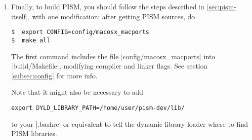 \documentclass[11pt,final]{amsart}
\begin{document}
\begin{enumerate}
{\begin{verbatim}
       if [ "${LIBNAME}" = "libpetscksp" ]; then OTHERLIBS="${PETSC_DM_LIB_BASIC}"  ; fi;\
       if [ "${LIBNAME}" = "libpetscsnes" ]; then OTHERLIBS="${PETSC_KSP_LIB_BASIC}"  ; fi;\
       if [ "${LIBNAME}" = "libpetscts" ]; then OTHERLIBS="${PETSC_SNES_LIB_BASIC}"  ; fi;\
       if [ "${LIBNAME}" = "libpetscfortran" ]; then OTHERLIBS="${PETSC_TS_LIB_BASIC}"  ; fi;\
       if [ "${LIBNAME}" = "libpetsccontrib" ]; then OTHERLIBS="${PETSC_TS_LIB_BASIC}"  ; fi;\
       if [ "${LIBNAME}" = "libslepc" ]; then OTHERLIBS="${PETSC_KSP_LIB_BASIC}"  ; fi;\
       if [ "${MACOSX_DEPLOYMENT_TARGET}" = "" ]; then MACOSX_DEPLOYMENT_TARGET=10.5; export MACOSX_DEPLOYMENT_TARGET; fi;\
       ${CC}  -dynamiclib -single_module -multiply_defined suppress -undefined dynamic_lookup\
              -o ${INSTALL_LIB_DIR}/$$LIBNAME.dylib *.o -L${PETSC_LIB_DIR}  ${OTHERSHAREDLIBS} ${SL_LINKER_LIBS} $$OTHERLIBS
\end{verbatim}
}
\noindent to make PETSc link shared libraries on Mac OS X 10.5 and add |'.dylib'| to lists of file extensions in
|python/PETSc/packages/X11.py| to make PETSc configure script find the X Window System.\footnote{Note that according to Matthew
  Knepley these bugs were actually fixed in the development version. (Which breaks for some other reason. -- CK)}

The next three commands completed the PETSc installation:
\begin{verbatim}
$  export PETSC_DIR=$PWD; export PETSC_ARCH=macosx;
$  ./config/configure.py --with-shared --with-c-support --with-clanguage=cxx\
                         --with-debugging=no --with-fortran=0\
                         --with-blas-lapack-dir=/usr/ --with-mpi-dir=/usr/ 
$  make all test
\end{verbatim}
\item Finally, to build PISM, you should follow the steps described in \ref{sec:pism-itself}, with one modification: after getting
  PISM sources, do
\begin{verbatim}
$  export CONFIG=config/macosx_macports
$  make all
\end{verbatim}
  The first command includes the file |config/macosx_macports| into |build/Makefile|, modifying compiler and linker flags. See
  section \ref{subsec:config} for more info.

  Note that it might also be necessary to add
\begin{verbatim}
export DYLD_LIBRARY_PATH=/home/user/pism-dev/lib/
\end{verbatim}
  to your |.bashrc| or equivalent to tell the dynamic library loader where to find PISM libraries.
\end{enumerate}
\end{document}

